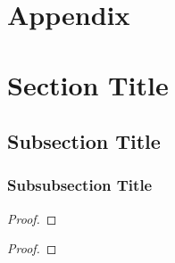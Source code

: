 \newpage
\appendix
\section*{Appendix}

\section{Section Title}

\lipsum[1]

\begin{defn}
    \lipsum[1]
\end{defn}

\begin{exmp}
    \lipsum[1]
\end{exmp}

\begin{rmrk}
    \lipsum[1]
\end{rmrk}

\subsection{Subsection Title}


\begin{defn}
    \lipsum[1]
\end{defn}

\begin{exmp}
    \lipsum[1]
\end{exmp}

\begin{rmrk}
    \lipsum[1]
\end{rmrk}

\subsubsection{Subsubsection Title}

\begin{lemm}
    \lipsum[1]
\end{lemm}

\begin{proof}
    \lipsum[1]
\end{proof}

\begin{thrm}
    \lipsum[1]
\end{thrm}

\begin{proof}
    \lipsum[1]
\end{proof}

